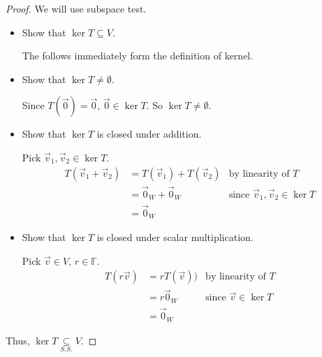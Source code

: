 \documentclass[11pt,fleqn]{book} %
\begin{document}
\begin{proof}
    We will use subspace test. 
    
    \begin{itemize}
        \item Show that $\ker T \subseteq V$. 

        The follows immediately form the definition of kernel. 

        \item Show that $\ker T \neq \emptyset$.
        
        Since $T(\vec{0})=\vec{0}$, $\vec{0} \in \ker T$. So $\ker T \neq \emptyset$. 

        \item Show that $\ker T$ is closed under addition. 
        
        Pick $\vec{v}_1, \vec{v}_2 \in \ker T$. 
        \begin{align*}
            T(\vec{v}_1 + \vec{v}_2)
            &=T(\vec{v}_1) + T(\vec{v}_2)
            &\text{by linearity of }T
            \\
            &=\vec{0}_W+\vec{0}_W
            &\text{since }\vec{v}_1, \vec{v}_2 \in \ker T
            \\
            &=\vec{0}_W
        \end{align*}

        \item Show that $\ker T$ is closed under scalar multiplication. 
        
        Pick $\vec{v} \in V$, $r \in \mathbb{F}$. 
        \begin{align*}
            T(r\vec{v})
            &=rT(\vec{v}))
            &\text{by linearity of }T
            \\
            &=r\vec{0}_W
            &\text{since }\vec{v} \in \ker T
            \\
            &=\vec{0}_W
        \end{align*}
    \end{itemize}
    
    Thus, $\ker T \underset{S.S.}{\subseteq} V$. 
\end{proof}
\end{document}
